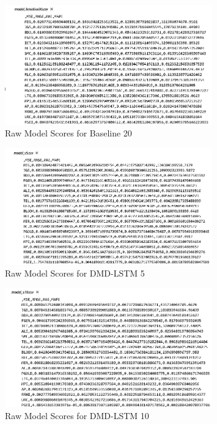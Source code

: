 \begin{figure}[ht]
    \centering
    \includegraphics[width=0.80\textwidth]{./assets/Appendices/B/RawScores/baseline20.png}
    \caption{Raw Model Scores for Baseline 20}
    \label{fig:rawScores_baseline20}
\end{figure}
\FloatBarrier

\begin{figure}[ht]
    \centering
    \includegraphics[width=0.80\textwidth]{./assets/Appendices/B/RawScores/dmdlstm5.png}
    \caption{Raw Model Scores for DMD-LSTM 5}
    \label{fig:rawScores_dmdlstm5}
\end{figure}
\FloatBarrier

\begin{figure}[ht]
    \centering
    \includegraphics[width=0.80\textwidth]{./assets/Appendices/B/RawScores/dmdlstm10.png}
    \caption{Raw Model Scores for DMD-LSTM 10}
    \label{fig:rawScores_dmdlstm10}
\end{figure}
\FloatBarrier

